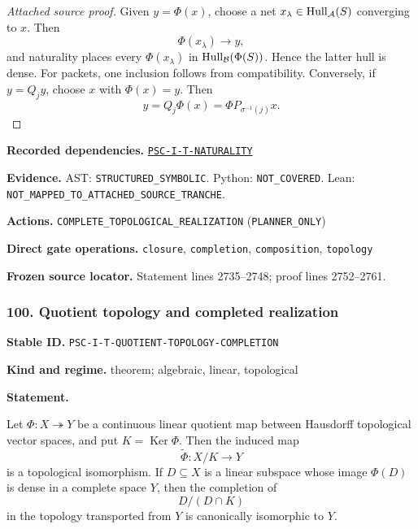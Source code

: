 \documentclass[a4paper,11pt]{article}
\newcommand{\Hull}{\operatorname{Hull}}\newcommand{\srank}{\operatorname{srank}}\newcommand{\psrank}{\operatorname{psrank}}\newcommand{\End}{\operatorname{End}}\newcommand{\Hom}{\operatorname{Hom}}\newcommand{\im}{\operatorname{im}}\newcommand{\Ker}{\operatorname{Ker}}\newcommand{\Jac}{\operatorname{Jac}}\newcommand{\Irr}{\operatorname{Irr}}\newcommand{\Span}{\operatorname{span}}\newcommand{\alg}{\operatorname{alg}}\newcommand{\Reach}{\operatorname{Reach}}\newcommand{\Supp}{\operatorname{Supp}}\newcommand{\id}{\mathrm{id}}\newcommand{\cl}[1]{\overline{#1}}
\newcommand{\field}[2]{\noindent\textbf{#1.} #2\par}
\begin{document}
\begin{proof}[Attached source proof]
Given $y=\Phi(x)$, choose a net $x_\lambda\in\Hull_\A(S)$ converging to $x$.  Then
\[
\Phi(x_\lambda)\to y,
\]
and naturality places every $\Phi(x_\lambda)$ in $\Hull_\B(\Phi(S))$.  Hence the latter hull is dense.  For packets, one inclusion follows from compatibility.  Conversely, if $y=Q_jy$, choose $x$ with $\Phi(x)=y$.  Then
\[
y=Q_j\Phi(x)=\Phi P_{\sigma^{-1}(j)}x.
\]
\end{proof}
\field{Recorded dependencies}{\hyperref[rec:PSC-I-T-NATURALITY]{\nolinkurl{PSC-I-T-NATURALITY}}}
\field{Evidence}{AST: \nolinkurl{STRUCTURED_SYMBOLIC}. Python: \nolinkurl{NOT_COVERED}. Lean: \nolinkurl{NOT_MAPPED_TO_ATTACHED_SOURCE_TRANCHE}.}
\field{Actions}{\nolinkurl{COMPLETE_TOPOLOGICAL_REALIZATION} (\nolinkurl{PLANNER_ONLY})}
\field{Direct gate operations}{\nolinkurl{closure}, \nolinkurl{completion}, \nolinkurl{composition}, \nolinkurl{topology}}
\field{Frozen source locator}{Statement lines 2735--2748; proof lines 2752--2761.}
\subsubsection*{100. Quotient topology and completed realization}
\label{rec:PSC-I-T-QUOTIENT-TOPOLOGY-COMPLETION}
\field{Stable ID}{\nolinkurl{PSC-I-T-QUOTIENT-TOPOLOGY-COMPLETION}}
\field{Kind and regime}{theorem; algebraic, linear, topological}
\textbf{Statement.}\par
Let $\Phi:X\twoheadrightarrow Y$ be a continuous linear quotient map between Hausdorff topological vector spaces, and put $K=\Ker\Phi$.  Then the induced map
\[
\widetilde\Phi:X/K\longrightarrow Y
\]
is a topological isomorphism.  If $D\subseteq X$ is a linear subspace whose image $\Phi(D)$ is dense in a complete space $Y$, then the completion of
\[
D/(D\cap K)
\]
in the topology transported from $Y$ is canonically isomorphic to $Y$.
\end{document}

